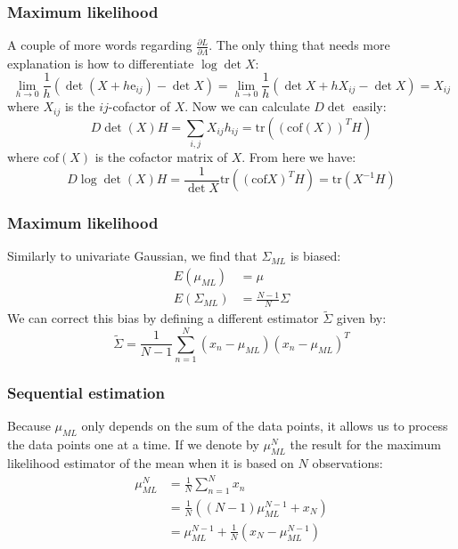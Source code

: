 \documentclass{beamer}
\begin{document}
\begin{frame}
    \frametitle{Maximum likelihood}
    A couple of more words regarding $\frac{\partial{}L}{\partial\Lambda}$. The only thing that needs more explanation is how to differentiate $\log\det{}X$:
    \begin{equation*}
        \lim_{h\to{}0}\frac{1}{h}(\det(X+h\mathrm{e}_{ij})-\det{}X)=\lim_{h\to{}0}\frac{1}{h}(\det{}X+hX_{ij}-\det{}X)=X_{ij}
    \end{equation*}
    where $X_{ij}$ is the $ij$-cofactor of $X$. Now we can calculate $D\det$ easily:
    \begin{equation*}
        D\det{}(X)H=\sum_{i,j}X_{ij}h_{ij}=\mathrm{tr}((\mathrm{cof}(X))^{T}H)
    \end{equation*}
    where $\mathrm{cof}(X)$ is the cofactor matrix of $X$. From here we have:
    \begin{equation*}
        D\log\det{}(X)H=\frac{1}{\det{}X}\mathrm{tr}((\mathrm{cof}X)^{T}H)=\mathrm{tr}(X^{-1}H)
    \end{equation*}
\end{frame}

\begin{frame}
    \frametitle{Maximum likelihood}
    Similarly to univariate Gaussian, we find that $\Sigma_{ML}$ is biased:
    \begin{align*}
        E(\mu_{ML})&=\mu \\
        E(\Sigma_{ML})&=\frac{N-1}{N}\Sigma
    \end{align*}
    We can correct this bias by defining a different estimator $\tilde{\Sigma}$ given by:
    \begin{equation*}
        \tilde{\Sigma}=\frac{1}{N-1}\sum_{n=1}^{N}(x_{n}-\mu_{ML})(x_{n}-\mu_{ML})^{T}
    \end{equation*}
\end{frame}

\begin{frame}
    \frametitle{Sequential estimation}
    Because $\mu_{ML}$ only depends on the sum of the data points, it allows us to process the data points one at a time. If we denote by $\mu_{ML}^{N}$ the result for the maximum likelihood estimator of the mean when it is based on $N$ observations:
    \begin{align*}
        \mu_{ML}^{N}&=\frac{1}{N}\sum_{n=1}^{N}x_{n} \\
        &=\frac{1}{N}((N-1)\mu_{ML}^{N-1}+x_{N}) \\
        &=\mu_{ML}^{N-1}+\frac{1}{N}(x_{N}-\mu_{ML}^{N-1})
    \end{align*}
\end{frame}
\end{document}
